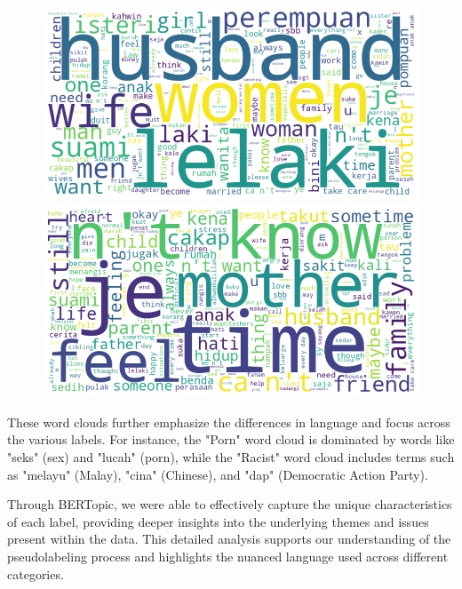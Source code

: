 \documentclass[preprint]{article}
\begin{document}
\begin{figure}[h]
\centering
\begin{minipage}[b]{0.45\textwidth}
\centering
\includegraphics[width=\linewidth]{img/sexist-wordcloud.png}
\end{minipage}
\hfill
\begin{minipage}[b]{0.45\textwidth}
\centering
\includegraphics[width=\linewidth]{img/mental-wordcloud.png}
\end{minipage}
\end{figure}






These word clouds further emphasize the differences in language and focus across the various labels. For instance, the "Porn" word cloud is dominated by words like "seks" (sex) and "lucah" (porn), while the "Racist" word cloud includes terms such as "melayu" (Malay), "cina" (Chinese), and "dap" (Democratic Action Party).

Through BERTopic, we were able to effectively capture the unique characteristics of each label, providing deeper insights into the underlying themes and issues present within the data. This detailed analysis supports our understanding of the pseudolabeling process and highlights the nuanced language used across different categories.
\end{document}
